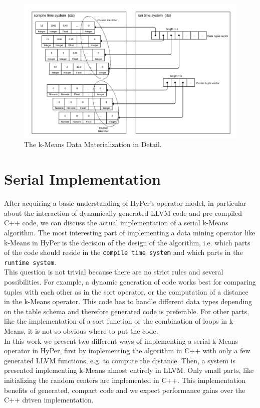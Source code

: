 \begin{figure}[htsb]
  \centerline{
  \includegraphics[scale=0.215]{figures/mat3_font2}}
  \caption[The k-Means Data Materialization in Detail]{The k-Means Data Materialization in Detail.}
  \label{fig:mat3}
\end{figure}


\section{Serial Implementation}\label{section:serial_implementation}

After acquiring a basic understanding of HyPer’s operator model, in particular about the interaction of dynamically generated LLVM code and pre-compiled C++ code, we can discuss the actual implementation of a serial k-Means algorithm. The most interesting part of implementing a data mining operator like k-Means in HyPer is the decision of the design of the algorithm, i.e. which parts of the code should reside in the \texttt{compile time system} and which parts in the \texttt{runtime system}. 
\\
This question is not trivial because there are no strict rules and several possibilities. For example, a dynamic generation of code works best for comparing tuples with each other as in the sort operator, or the computation of a distance in the k-Means operator. This code has to handle different data types depending on the table schema and therefore generated code is preferable. For other parts, like the implementation of a sort function or the combination of loops in k-Means, it is not so obvious where to put the code.
\\
In this work we present two different ways of implementing a serial k-Means operator in HyPer, first by implementing the algorithm in C++ with only a few generated LLVM functions, e.g. to compute the distance. Then, a system is presented implementing k-Means almost entirely in LLVM. Only small parts, like initializing the random centers are implemented in C++. This implementation benefits of generated, compact code and we expect performance gains over the C++ driven implementation.


